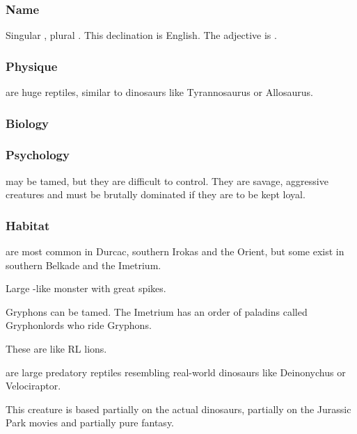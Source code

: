 \subsubsection{Name}
Singular , plural \emph{\cortios{}}. This declination is English. The adjective is \emph{\cortio{}}. 

\subsubsection{Physique}
\Cortios{} are huge reptiles, similar to dinosaurs like Tyrannosaurus or Allosaurus. 

\subsubsection{Biology}
\subsubsection{Psychology}
\Cortios{} may be tamed, but they are difficult to control. They are savage, aggressive creatures and must be brutally dominated if they are to be kept loyal. 

\subsubsection{Habitat}
\Cortios{} are most common in Durcac, southern Irokas and the Orient, but some exist in southern Belkade and the Imetrium. 



Large \dragon-like monster with great spikes. 



Gryphons can be tamed. The Imetrium has an order of paladins called Gryphonlords who ride Gryphons. 



These are like RL lions. 



\subsectionn{\Nycan{}}
\label{Nycan}
\Nycans{} are large predatory reptiles resembling real-world dinosaurs like Deinonychus or Velociraptor. 

This creature is based partially on the actual dinosaurs, partially on the Jurassic Park movies and partially pure fantasy. 

